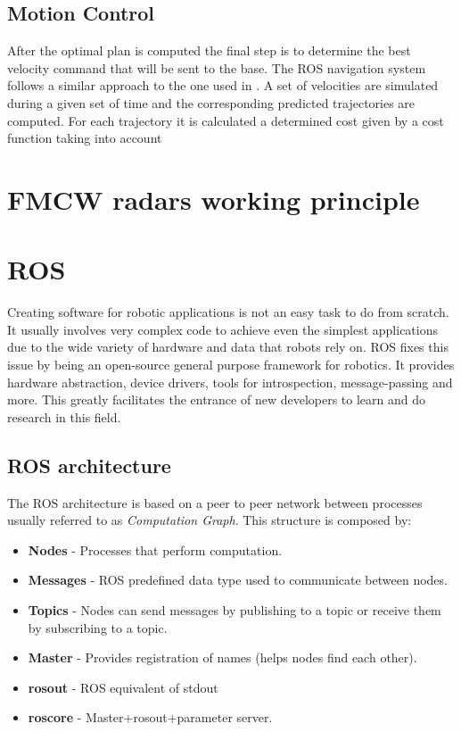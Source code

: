 \subsection{Motion Control}
After the optimal plan is computed the final step is to determine the best velocity command that will be sent to the base.  The ROS navigation system follows a similar approach to the one used in \cite{gerkey2008planning}. A set of velocities are simulated during a given set of time and the corresponding predicted trajectories are  computed. For each trajectory it is calculated a determined cost given by a cost function  taking into account 
\section {\ac{FMCW} radars working principle}

\section {ROS}
Creating software for robotic applications is not an easy task to do from scratch. It usually involves very complex code to achieve even the simplest applications due to the wide variety of hardware and data that robots rely on. \ac{ROS} fixes this issue by being an open-source general purpose framework for robotics. It provides hardware abstraction, device drivers, tools for introspection, message-passing and more. This greatly facilitates the entrance of new developers to learn and do research in this field.
\subsection{ROS architecture}
The \ac{ROS}  architecture is based on a peer to peer network between processes usually referred to as \textit{Computation Graph}.
This structure is composed by:
\begin{itemize}
\item \textbf{Nodes} - Processes that perform computation.
\item \textbf{Messages} - ROS predefined data type used to communicate between nodes. 
\item \textbf{Topics} - Nodes can send messages by publishing to a topic or receive them by subscribing to a topic. 
\item \textbf{Master} - Provides registration of names (helps nodes find each other).
\item \textbf{rosout} - ROS equivalent of stdout 
\item \textbf{roscore} - Master+rosout+parameter server. 
\end{itemize}

